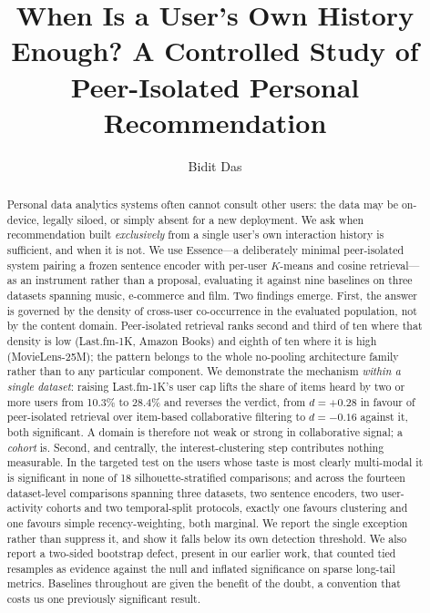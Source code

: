 \documentclass[runningheads]{llncs}
\begin{document}
\title{When Is a User's Own History Enough? A Controlled Study of
Peer-Isolated Personal Recommendation}

\author{Bidit Das}

\maketitle

\begin{abstract}
Personal data analytics systems often cannot consult other users: the data may be
on-device, legally siloed, or simply absent for a new deployment. We ask when
recommendation built \emph{exclusively} from a single user's own interaction history is
sufficient, and when it is not. We use Essence---a deliberately minimal peer-isolated
system pairing a frozen sentence encoder with per-user $K$-means and cosine
retrieval---as an instrument rather than a proposal, evaluating it against nine baselines
on three datasets spanning music, e-commerce and film.
Two findings emerge. First, the answer is governed by the density of cross-user
co-occurrence in the evaluated population, not by the content domain. Peer-isolated
retrieval ranks second and third of ten where that density is low (Last.fm-1K, Amazon
Books) and eighth of ten where it is high (MovieLens-25M); the pattern belongs to the
whole no-pooling architecture family rather than to any particular component. We
demonstrate the mechanism \emph{within a single dataset}: raising Last.fm-1K's user cap
lifts the share of items heard by two or more users from 10.3\% to 28.4\% and reverses the
verdict, from $d = +0.28$ in favour of peer-isolated retrieval over item-based
collaborative filtering to $d = -0.16$ against it, both significant. A domain is therefore
not weak or strong in collaborative signal; a \emph{cohort} is. Second, and centrally, the interest-clustering step contributes nothing
measurable. In the targeted test on the users whose taste is most clearly multi-modal it is
significant in none of 18 silhouette-stratified comparisons; and across the fourteen
dataset-level comparisons spanning three datasets, two sentence encoders, two user-activity
cohorts and two temporal-split protocols, exactly one favours clustering and one favours
simple recency-weighting, both marginal.
We report the single exception rather than suppress it, and show it falls below its own
detection threshold. We also report a two-sided bootstrap defect, present in our earlier
work, that counted tied resamples as evidence against the null and inflated significance
on sparse long-tail metrics. Baselines throughout are given the benefit of the doubt, a
convention that costs us one previously significant result.
\end{abstract}
\end{document}
